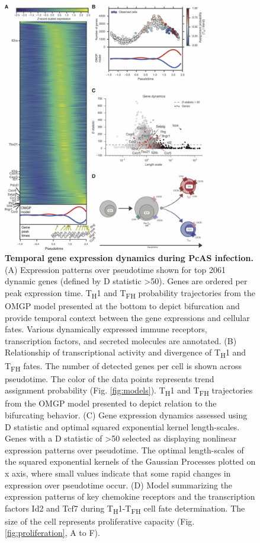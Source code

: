\begin{figure}
    \centering
    \includegraphics[width=0.8\textwidth]{"Fig5"}
    \caption[Temporal gene expression dynamics during PcAS infection]{\textbf{Temporal gene expression dynamics during PcAS infection.}
    (A) Expression patterns over pseudotime shown for top 2061 dynamic genes (defined by D statistic >50). Genes are ordered per peak expression time.  T\textsubscript{H}1 and T\textsubscript{FH} probability trajectories from the  OMGP model presented at the bottom to depict bifurcation and provide temporal context between the gene expressions and cellular fates. Various dynamically expressed immune receptors, transcription factors, and secreted molecules are annotated. (B) Relationship of transcriptional activity and divergence of T\textsubscript{H}1 and T\textsubscript{FH} fates. The number of detected genes per cell is shown across pseudotime. The color of the data points represents trend assignment probability (Fig. \ref{fig:models}).  T\textsubscript{H}1 and T\textsubscript{FH} trajectories from the  OMGP model presented to depict relation to the bifurcating behavior. (C) Gene expression dynamics assessed using D statistic and optimal squared exponential kernel length-scales. Genes with a D statistic of >50 selected as displaying nonlinear expression patterns over pseudotime. The optimal length-scales of the squared exponential kernels of the Gaussian Processes plotted on x axis, where small values indicate that some rapid changes in expression over pseudotime occur. (D) Model summarizing the expression patterns of key chemokine receptors and the transcription factors Id2 and Tcf7 during T\textsubscript{H}1-T\textsubscript{FH} cell fate determination. The size of the cell represents proliferative capacity (Fig. \ref{fig:proliferation}, A to F).
    }
   \label{fig:temporal}
\end{figure}

